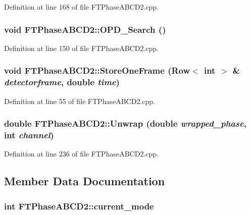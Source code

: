 Definition at line 168 of file FTPhaseABCD2.cpp.

\hypertarget{classFTPhaseABCD2_a23a931c7735b2c0809d05fb08c3ddf0e}{
\subsubsection[{OPD\_\-Search}]{\setlength{\rightskip}{0pt plus 5cm}void FTPhaseABCD2::OPD\_\-Search ()}}
\label{classFTPhaseABCD2_a23a931c7735b2c0809d05fb08c3ddf0e}


Definition at line 150 of file FTPhaseABCD2.cpp.

\hypertarget{classFTPhaseABCD2_ad4b0d7297334da3cb4454f90fd6cb09f}{
\subsubsection[{StoreOneFrame}]{\setlength{\rightskip}{0pt plus 5cm}void FTPhaseABCD2::StoreOneFrame ({\bf Row}$<$ int $>$ \& {\em detectorframe}, \/  double {\em time})}}
\label{classFTPhaseABCD2_ad4b0d7297334da3cb4454f90fd6cb09f}


Definition at line 55 of file FTPhaseABCD2.cpp.

\hypertarget{classFTPhaseABCD2_a075b8f4137bbfcb352f6c97aa43d96c5}{
\subsubsection[{Unwrap}]{\setlength{\rightskip}{0pt plus 5cm}double FTPhaseABCD2::Unwrap (double {\em wrapped\_\-phase}, \/  int {\em channel})}}
\label{classFTPhaseABCD2_a075b8f4137bbfcb352f6c97aa43d96c5}


Definition at line 236 of file FTPhaseABCD2.cpp.



\subsection{Member Data Documentation}
\hypertarget{classFTPhaseABCD2_aa0fa5ac123af8b56b2a26fa05721da61}{
\subsubsection[{current\_\-mode}]{\setlength{\rightskip}{0pt plus 5cm}int {\bf FTPhaseABCD2::current\_\-mode}}}
\label{classFTPhaseABCD2_aa0fa5ac123af8b56b2a26fa05721da61}


